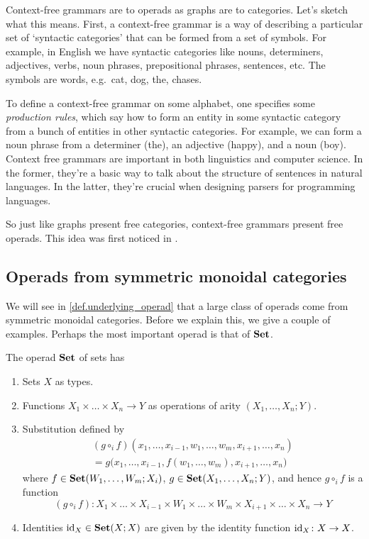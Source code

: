 \documentclass[7Sketches]{subfiles}
\begin{document}
\begin{example}%
  Context-free grammars are to operads as graphs are to categories.  Let's
  sketch what this means. First, a context-free grammar is a way of describing a
  particular set of `syntactic categories' that can be formed from a set of
  symbols. For example, in English we have syntactic categories like nouns,
  determiners, adjectives, verbs, noun phrases, prepositional phrases,
  sentences, etc. The symbols are words, e.g.\ cat, dog, the, chases.
  
  To define a context-free grammar on some alphabet, one specifies some
  \emph{production rules}, which say how to form an entity in some syntactic
  category from a bunch of entities in other syntactic categories. For example,
  we can form a noun phrase from a determiner (the), an adjective (happy), and a
  noun (boy). Context free grammars are important in both linguistics and
  computer science. In the former, they're a basic way to talk about the
  structure of sentences in natural languages. In the latter, they're crucial
  when designing parsers for programming languages.

  So just like graphs present free categories, context-free grammars present free operads. This idea was first noticed in \cite{Hermida.Makkai.Power:1998a}.
\end{example}

\subsection{Operads from symmetric monoidal categories}
%
%
\label{subsec.mon_cat_operads}
We will see in \cref{def.underlying_operad} that a large class of operads come from symmetric monoidal categories. Before we explain this, we give a couple of examples. Perhaps the most important operad is that of $\mathbf{Set}$. 

\begin{example}%
The operad $\mathbf{Set}$ of sets has 
\begin{enumerate}[label=(\roman*)]
\item Sets $X$ as types.
\item Functions $X_1\times \dots \times X_n \to Y$ as operations of arity
$(X_1,\dots, X_n;Y)$.
\item Substitution defined by 
\begin{multline*}
(g\circ_if)(x_1,\dots,x_{i-1},w_1,\dots,w_m,x_{i+1},\dots,x_n)\\
 =
g\big(x_1,\dots,x_{i-1},f(w_1,\dots,w_m),x_{i+1},\dots,x_n\big)
\end{multline*}
where $f\in \mathbf{Set}(W_1,\dots,W_m;X_i)$, $g \in \mathbf{Set}(X_1,\dots,X_n;Y)$, and
hence $g\circ_if$ is a function 
\[
(g\circ_if)\colon
X_1 \times \dots \times X_{i-1}\times W_1\times \dots \times
W_m\times X_{i+1}\times \dots \times X_n \longrightarrow Y 
\]
\item Identities $\mathrm{id}_X\in \mathbf{Set}(X;X)$ are given by the identity function
$\mathrm{id}_X\colon X \to X$.
\qedhere
\end{enumerate}
\end{example}
\end{document}
